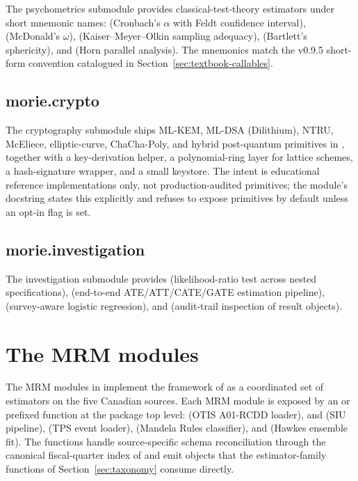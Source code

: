\documentclass[article,shortnames,nojss]{jss}
\begin{document}
The psychometrics submodule  provides
classical-test-theory estimators under short mnemonic names:
 (Cronbach's $\alpha$ with Feldt confidence interval),
 (McDonald's $\omega$),  (Kaiser--Meyer--Olkin
sampling adequacy),  (Bartlett's sphericity), and
 (Horn parallel analysis). The mnemonics match the
v0.9.5 short-form convention catalogued in
Section~\ref{sec:textbook-callables}.

\subsection{morie.crypto}

The cryptography submodule ships ML-KEM, ML-DSA (Dilithium),
NTRU, McEliece, elliptic-curve, ChaCha-Poly, and hybrid
post-quantum primitives in , together
with a key-derivation helper, a polynomial-ring layer for
lattice schemes, a hash-signature wrapper, and a small
keystore. The intent is educational reference implementations
only, not production-audited primitives; the module's docstring
states this explicitly and refuses to expose primitives by
default unless an opt-in flag is set.

\subsection{morie.investigation}

The investigation submodule provides
 (likelihood-ratio test
across nested specifications),
 (end-to-end
ATE/ATT/CATE/GATE estimation pipeline),
 (survey-aware logistic
regression), and  (audit-trail inspection
of result objects).

\section{The MRM modules}
\label{sec:mrm}

The MRM modules in  implement the framework of
\citet{Ruhela2026MRM} as a coordinated set of estimators on the
five Canadian sources. Each MRM module is exposed by an
 or  prefixed function at the package top level:
 (OTIS A01-RCDD loader),
 and
 (SIU pipeline),
 (TPS event loader),
 (Mandela Rules classifier),
and  (Hawkes ensemble fit).
The functions handle source-specific schema reconciliation
through the canonical fiscal-quarter index of
\citet{Ruhela2026MRM} and emit  
objects that the estimator-family functions of
Section~\ref{sec:taxonomy} consume directly.
\end{document}
